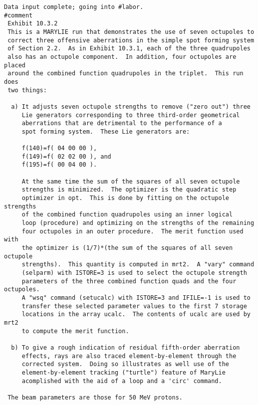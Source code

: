 \begin{footnotesize}
\begin{verbatim}
Data input complete; going into #labor.
#comment
 Exhibit 10.3.2
 This is a MARYLIE run that demonstrates the use of seven octupoles to
 correct three offensive aberrations in the simple spot forming system
 of Section 2.2.  As in Exhibit 10.3.1, each of the three quadrupoles
 also has an octupole component.  In addition, four octupoles are placed
 around the combined function quadrupoles in the triplet.  This run does
 two things:

  a) It adjusts seven octupole strengths to remove ("zero out") three
     Lie generators corresponding to three third-order geometrical
     aberrations that are detrimental to the performance of a
     spot forming system.  These Lie generators are:

     f(140)=f( 04 00 00 ),
     f(149)=f( 02 02 00 ), and
     f(195)=f( 00 04 00 ).

     At the same time the sum of the squares of all seven octupole
     strengths is minimized.  The optimizer is the quadratic step
     optimizer in opt.  This is done by fitting on the octupole strengths
     of the combined function quadrupoles using an inner logical
     loop (procedure) and optimizing on the strengths of the remaining
     four octupoles in an outer procedure.  The merit function used with
     the optimizer is (1/7)*(the sum of the squares of all seven octupole
     strengths).  This quantity is computed in mrt2.  A "vary" command
     (selparm) with ISTORE=3 is used to select the octupole strength
     parameters of the three combined function quads and the four octupoles.
     A "wsq" command (setucalc) with ISTORE=3 and IFILE=-1 is used to
     transfer these selected parameter values to the first 7 storage
     locations in the array ucalc.  The contents of ucalc are used by mrt2
     to compute the merit function.

  b) To give a rough indication of residual fifth-order aberration
     effects, rays are also traced element-by-element through the
     corrected system.  Doing so illustrates as well use of the
     element-by-element tracking ("turtle") feature of MaryLie
     acomplished with the aid of a loop and a 'circ' command.

 The beam parameters are those for 50 MeV protons.


\end{verbatim}
\end{footnotesize}
